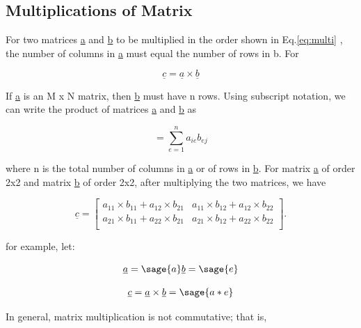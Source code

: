 \documentclass[12pt]{report}
\newcommand{\eref}[1]{
	Eq.\ref{#1}
}
\begin{document}

\subsection{Multiplications of Matrix}

For two matrices \underline{a} and \underline{b}
to be multiplied in the order shown in \eref{eq:multi},
the number of columns in \underline{a} must equal the
number of rows in b. For

\begin{equation}
	\underline{c} = \underline{a} \times \underline{b}	
	\label{eq:multi}
\end{equation}

If \underline{a} is an M x N matrix,
then \underline{b} must have n
rows. Using subscript notation, 
we can write the product of matrices
\underline{a} and \underline{b} as

\begin{equation}
	[c_{{ij}}] = \sum_{e=1}^{n} {a_{ie}}{b_{ej}}
\end  {equation}

where n is the total number of columns in \underline{a} or of rows in
\underline{b}. For matrix \underline{a} of order 2x2 and matrix
\underline{b} of order 2x2, after multiplying the two matrices, we
have

\begin{equation}
	\underline{c}=\left[\begin{array}{rrrrrr}
	a_{11} \times b_{11} + a_{12} \times b_{21} & 
	a_{11} \times b_{12} + a_{12} \times b_{22}\\
	a_{21} \times b_{11} + a_{22} \times b_{21} & 
	a_{21} \times b_{12} + a_{22} \times b_{22}\\
\end{array}\right].
\end{equation}

for example, let:

$$
\underline{a} = \sage{a}\nonumber 
\underline{b} = \sage{e}\nonumber
$$

\begin{eqnarray}
	\underline{c} =\underline{a} \times \underline{b} = \sage{a*e}
\end{eqnarray}

In general, matrix multiplication is not commutative; 
that is,
\end{document}
